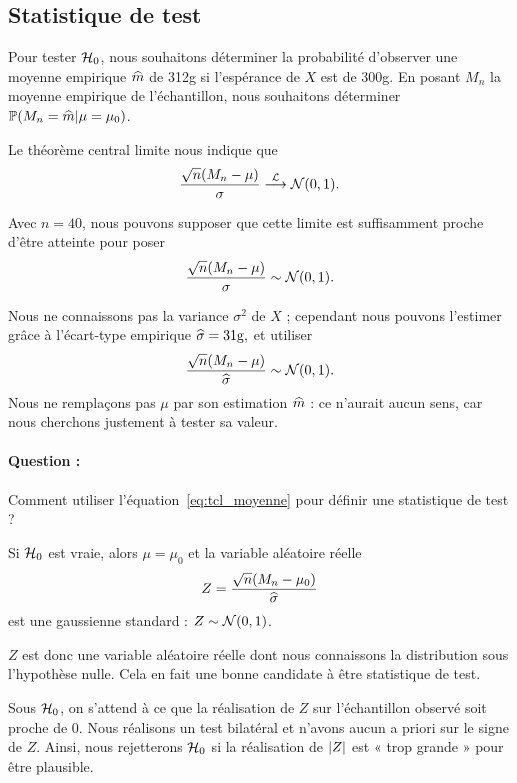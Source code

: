 \subsection{Statistique de test}
Pour tester $\HH_0$, nous souhaitons déterminer la probabilité d'observer une
moyenne empirique $\hatm$ de 312g si l'espérance de $X$ est de 300g.  En
posant $M_n$ la moyenne empirique de l'échantillon, nous souhaitons déterminer
$\PP(M_n=\hatm|\mu=\mu_0)$.

Le théorème central limite nous indique que 
\[
  \frac{\sqrt{n} (M_n - \mu)}{\sigma}  \cvloi \Ncal(0, 1).
\]

Avec $n = 40$, nous pouvons supposer que cette limite est suffisamment proche
d'être atteinte pour poser
\[
  \frac{\sqrt{n} (M_n - \mu)}{\sigma}  \sim \Ncal(0, 1).
\]

Nous ne connaissons pas la variance $\sigma^2$ de $X$ ; cependant nous pouvons
l'estimer grâce à l'écart-type empirique $\hatsigma = 31\si{g},$ et utiliser 
\begin{equation}
  \frac{\sqrt{n} (M_n - \mu)}{\hatsigma}  \sim \Ncal(0, 1).
\label{eq:tcl_moyenne}
\end{equation}
Nous ne remplaçons pas $\mu$ par son estimation $\hatm$ : ce n'aurait aucun
sens, car nous cherchons justement à tester sa valeur.

\paragraph{Question :} Comment utiliser l'équation~\eqref{eq:tcl_moyenne} pour
définir une statistique de test ?
\begin{answer}
  Si $\HH_0$ est vraie, alors $\mu = \mu_0$ et la variable aléatoire réelle
  \begin{equation}
    \label{eq:z_moyennes}
    Z = \frac{\sqrt{n} (M_n - \mu_0)}{\hatsigma}
  \end{equation}
  est une gaussienne standard : $Z \sim \Ncal(0, 1)$.

  $Z$ est donc une variable aléatoire réelle dont nous connaissons la
  distribution sous l'hypothèse nulle. Cela en fait une bonne candidate à être
  statistique de test.
\end{answer}
Sous $\HH_0$, on s'attend à ce que la réalisation de $Z$ sur l'échantillon
observé soit proche de $0.$ Nous réalisons un test bilatéral et n'avons aucun a
priori sur le signe de $Z.$ Ainsi, nous rejetterons $\HH_0$ si la réalisation
de $\abs{Z}$ est « trop grande » pour être plausible.


